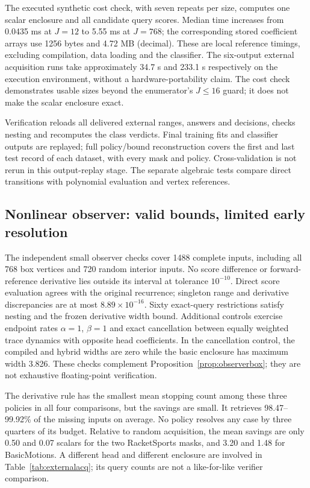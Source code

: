 \documentclass[11pt,a4paper]{article}
\theoremstyle{definition}\newtheorem{definition}[theorem]{Definition}
\begin{document}
The executed synthetic cost check, with seven repeats per size, computes one scalar enclosure and all candidate query scores. Median time increases from 0.0435 ms at $J=12$ to 5.55 ms at $J=768$; the corresponding stored coefficient arrays use 1256 bytes and 4.72 MB (decimal). These are local reference timings, excluding compilation, data loading and the classifier. The six-output external acquisition runs take approximately 34.7 s and 233.1 s respectively on the execution environment, without a hardware-portability claim. The cost check demonstrates usable sizes beyond the enumerator's $J\leq16$ guard; it does not make the scalar enclosure exact.

Verification reloads all delivered external ranges, answers and decisions, checks nesting and recomputes the class verdicts. Final training fits and classifier outputs are replayed; full policy/bound reconstruction covers the first and last test record of each dataset, with every mask and policy. Cross-validation is not rerun in this output-replay stage. The separate algebraic tests compare direct transitions with polynomial evaluation and vertex references.

\subsection{Nonlinear observer: valid bounds, limited early resolution}
The independent small observer checks cover 1488 complete inputs, including all 768 box vertices and 720 random interior inputs. No score difference or forward-reference derivative lies outside its interval at tolerance $10^{-10}$. Direct score evaluation agrees with the original recurrence; singleton range and derivative discrepancies are at most $8.89\times10^{-16}$. Sixty exact-query restrictions satisfy nesting and the frozen derivative width bound. Additional controls exercise endpoint rates $\alpha=1$, $\beta=1$ and exact cancellation between equally weighted trace dynamics with opposite head coefficients. In the cancellation control, the compiled and hybrid widths are zero while the basic enclosure has maximum width 3.826. These checks complement Proposition~\ref{prop:observerbox}; they are not exhaustive floating-point verification.

\begin{table}[!htbp]\centering\small
\caption{Frozen nonlinear observer: mean scalar queries until its winner is resolved using hybrid bounds. All 152 or 40 original test cases enter each mean. The classifier is not refitted.}
\label{tab:observeracq}
\end{table}
The derivative rule has the smallest mean stopping count among these three policies in all four comparisons, but the savings are small. It retrieves 98.47--99.92\% of the missing inputs on average. No policy resolves any case by three quarters of its budget. Relative to random acquisition, the mean savings are only 0.50 and 0.07 scalars for the two RacketSports masks, and 3.20 and 1.48 for BasicMotions. A different head and different enclosure are involved in Table~\ref{tab:externalacq}; its query counts are not a like-for-like verifier comparison.
\end{document}
